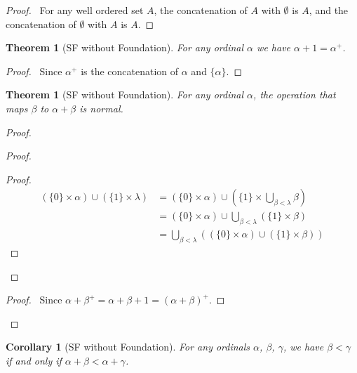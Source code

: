 \documentclass{book}
\let\qed\relax
\newtheorem{cor}{Corollary}[ax]
\newtheorem{thm}[ax]{Theorem}
\theoremstyle{definition}
\begin{document}
\begin{proof}
\pf\ For any well ordered set $A$, the concatenation of $A$ with $\emptyset$ is $A$, and the concatenation of $\emptyset$ with $A$ is $A$. \qed
\end{proof}

\begin{thm}[SF without Foundation]
For any ordinal $\alpha$ we have $\alpha + 1 = \alpha^+$.
\end{thm}

\begin{proof}
\pf\ Since $\alpha^+$ is the concatenation of $\alpha$ and $\{ \alpha \}$. \qed
\end{proof}

\begin{thm}[SF without Foundation]
For any ordinal $\alpha$, the operation that maps $\beta$ to $\alpha + \beta$ is normal.
\end{thm}

\begin{proof}
\pf
{}
\begin{proof}
	\begin{proof}
		\pf
		\begin{align*}
			(\{0\} \times \alpha) \cup (\{1\} \times \lambda) & = (\{0\} \times \alpha) \cup (\{1\} \times \bigcup_{\beta < \lambda} \beta) \\
			& = (\{0\} \times \alpha) \cup \bigcup_{\beta < \lambda} (\{1\} \times \beta) \\
			& = \bigcup_{\beta < \lambda} ((\{0\} \times \alpha) \cup (\{1\} \times \beta))
		\end{align*}
	\end{proof}
\end{proof}
\begin{proof}
	\pf\ Since $\alpha + \beta^+ = \alpha + \beta + 1 = (\alpha + \beta)^+$.
\end{proof}
\qed
\end{proof}

\begin{cor}[SF without Foundation]
\label{cor:pluslt}
For any ordinals $\alpha$, $\beta$, $\gamma$, we have $\beta < \gamma$ if and only if $\alpha + \beta < \alpha + \gamma$.
\end{cor}
\end{document}

